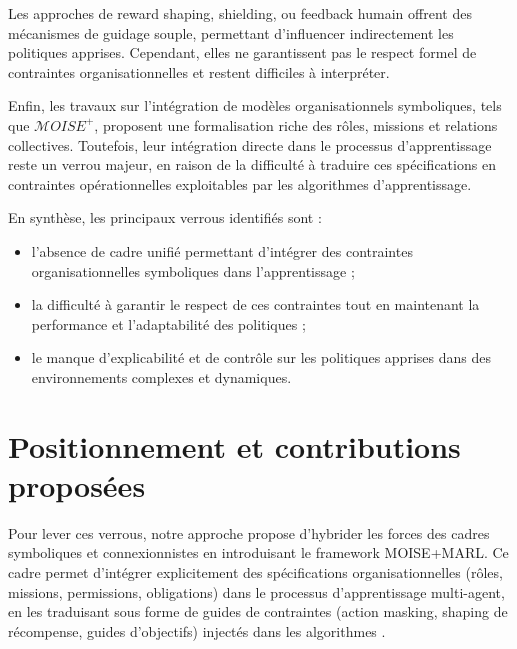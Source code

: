 Les approches de reward shaping, shielding, ou feedback humain offrent des mécanismes de guidage souple, permettant d’influencer indirectement les politiques apprises. Cependant, elles ne garantissent pas le respect formel de contraintes organisationnelles et restent difficiles à interpréter.

Enfin, les travaux sur l’intégration de modèles organisationnels symboliques, tels que $\mathcal{M}OISE^+$, proposent une formalisation riche des rôles, missions et relations collectives. Toutefois, leur intégration directe dans le processus d’apprentissage  reste un verrou majeur, en raison de la difficulté à traduire ces spécifications en contraintes opérationnelles exploitables par les algorithmes d’apprentissage.

En synthèse, les principaux verrous identifiés sont :
\begin{itemize}
    \item l’absence de cadre unifié permettant d’intégrer des contraintes organisationnelles symboliques dans l’apprentissage  ;
    \item la difficulté à garantir le respect de ces contraintes tout en maintenant la performance et l’adaptabilité des politiques ;
    \item le manque d’explicabilité et de contrôle sur les politiques apprises dans des environnements complexes et dynamiques.
\end{itemize}

\section{Positionnement et contributions proposées}

Pour lever ces verrous, notre approche propose d’hybrider les forces des cadres symboliques et connexionnistes en introduisant le framework MOISE+MARL. Ce cadre permet d’intégrer explicitement des spécifications organisationnelles (rôles, missions, permissions, obligations) dans le processus d’apprentissage multi-agent, en les traduisant sous forme de guides de contraintes (action masking, shaping de récompense, guides d’objectifs) injectés dans les algorithmes .


